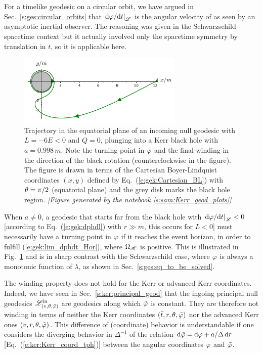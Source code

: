 \begin{remark}
For a timelike geodesic on a circular orbit, we have argued in Sec.~\ref{s:ges:circular_orbits}
that $\left. \mathrm{d}\varphi/\mathrm{d} t \right| _{\mathscr{L}}$ is the angular velocity of
as seen by an asymptotic inertial observer. The reasoning was
given in the Schwarzschild spacetime context but it actually involved only
the spacetime symmetry by translation in $t$, so it is applicable here.
\end{remark}

\begin{figure}
\centerline{\includegraphics[width=0.7\textwidth]{gek_winding_null.pdf}}
\caption[]{\label{f:gek:winding_null} \footnotesize
Trajectory in the equatorial plane of an incoming null geodesic with
$L=-6E < 0$ and $Q=0$, plunging into a Kerr black hole with $a = 0.998 \, m$.
Note the turning point in $\varphi$ and the final winding in the direction of the black
rotation (counterclockwise in the figure). The figure is drawn in terms
of the Cartesian Boyer-Lindquist coordinates $(x,y)$ defined by
Eq.~(\ref{e:gek:Cartesian_BL}) with $\theta=\pi/2$ (equatorial plane)
and the grey disk marks the black hole region.
\textsl{[Figure generated by the notebook \ref{s:sam:Kerr_geod_plots}]}
}
\end{figure}


\begin{remark}
When $a\not=0$,
a geodesic that starts far from the black hole with
$\left. \mathrm{d}\varphi/\mathrm{d} t \right| _{\mathscr{L}} < 0$ [according to Eq.~(\ref{e:gek:dphdl}) with $r\gg m$,
this occurs for $L <0$]
must necessarily have a turning point in $\varphi$
if it reaches the event horizon, in order to fulfill (\ref{e:gek:lim_dphdt_Hor}),
where $\Omega_{\mathscr{H}}$ is positive. This is illustrated in Fig.~\ref{f:gek:winding_null}
and is in sharp contrast with the Schwarzschild case, where $\varphi$ is always
a monotonic function of $\lambda$, as shown in Sec.~\ref{s:ges:eq_to_be_solved}.
\end{remark}


\begin{remark}
The winding property does not hold for the Kerr or advanced Kerr coordinates. Indeed,
we have seen in Sec.~\ref{s:ker:principal_geod} that the
ingoing principal null geodesics $\mathscr{L}^{\rm in}_{(v,\theta,{\tilde\varphi})}$ are geodesics
along which ${\tilde\varphi}$ is constant. They are therefore not winding in terms
of neither the Kerr coordinates $({\tilde t},r,\theta,{\tilde\varphi})$ nor the advanced Kerr ones $(v,r,\theta,{\tilde\varphi})$.
This difference of (coordinate) behavior is understandable if one considers
the diverging behavior in $\Delta^{-1}$ of the
relation $\mathrm{d} {\tilde\varphi} = \mathrm{d} \varphi + a/\Delta\, \mathrm{d} r$ [Eq.~(\ref{e:ker:Kerr_coord_tph})]
between the angular coordinates $\varphi$ and ${\tilde\varphi}$.
\end{remark}

